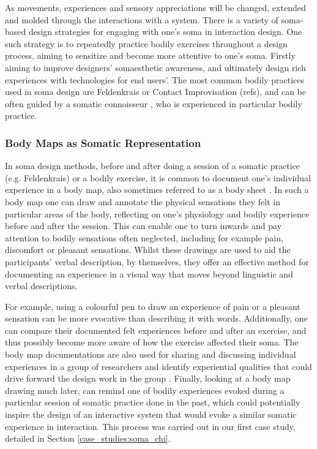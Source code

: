 As movements, experiences and sensory appreciations will be changed, extended and molded through the interactions with a system. There is a variety of soma-based design strategies for engaging with one's soma in interaction design. One such strategy is to repeatedly practice bodily exercises throughout a design process, aiming to sensitize and become more attentive to one's soma. Firstly aiming to improve designers’ somaesthetic awareness, and ultimately design rich experiences with technologies for end users'. The most common bodily practices used in soma design are Feldenkrais or Contact Improvisation (refs), and can be often guided by a somatic connoisseur \cite{schiphorst_self-evidence_2011}, who is experienced in particular bodily practice.

\subsubsection{Body Maps as Somatic Representation}

In soma design methods, before and after doing a session of a somatic practice (e.g. Feldenkrais) or a bodily exercise, it is common to document one's individual experience in a body map, also sometimes referred to as a body sheet \cite{windlin_soma_2019}. In such a body map one can draw and annotate the physical sensations they felt in particular areas of the body, reflecting on one's physiology and bodily experience before and after the session. This can enable one to turn inwards and pay attention to bodily sensations often neglected, including for example pain, discomfort or pleasant sensations. Whilst these drawings are used to aid the participants' verbal description, by themselves, they offer an effective method for documenting an experience in a visual way that moves beyond linguistic and verbal descriptions.

For example, using a colourful pen to draw an experience of pain or a pleasant sensation can be more evocative than describing it with words. Additionally, one can compare their documented felt experiences before and after an exercise, and thus possibly become more aware of how the exercise affected their soma. The body map documentations are also used for sharing and discussing individual experiences in a group of researchers and identify experiential qualities that could drive forward the design work in the group \cite{tennent_soma_2020}. Finally, looking at a body map drawing much later, can remind one of bodily experiences evoked during a particular session of somatic practice done in the past, which could potentially inspire the design of an interactive system that would evoke a similar somatic experience in interaction. This process was carried out in our first case study, detailed in Section \ref{case_studies:soma_chi}.

